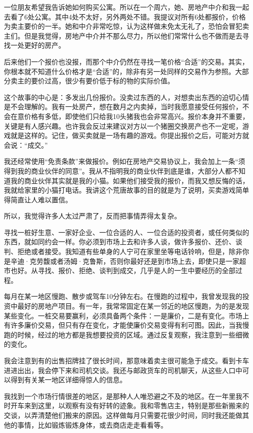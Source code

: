 一位朋友希望我告诉她如何购买公寓。所以在一个周六，她、房地产中介和我一起去看了6处公寓。其中4处不太好，另外两处不错。我提议对所有6处都报价，价格为卖主要价的一半。她和中介非常吃惊，认为这样做未免太无礼了，恐怕会冒犯卖主们。但是我觉得，房地产中介并不那么尽力，所以他们常常什么也不做而是去寻找一处更好的房产。

后来他们一个报价也没报，而那个中介仍然在寻找一笔价格“合适”的交易。其实，你根本就不知道什么价格才是“合适”的，除非有另一处同样的交易作为参照。大部分卖主的要价过高，很少有要价低于标的物的实际价值。

这个故事的中心是：多发出几份报价。没卖过东西的人，对想卖出东西的迫切心情是不会理解的。我有一处房产，想在数月之内卖掉，当时我愿意接受任何报价，不会在意价格有多低，即使他们只给我10头猪我也会非常高兴。报价本身并不重要，关键是有人感兴趣。也许我会反过来建议对方以一个猪圈交换房产也不一定呢，游戏就是这样的。记住，做买卖就是一场有趣的游戏。你提出报价之后，可能对方就会说：“成交。”

我还经常使用“免责条款”来做报价。例如在房地产交易协议上，我会加上一条“须得到我的商业伙伴的同意”。我从不指明我的商业伙伴到底是谁，大部分人都不知道我的商业伙伴其实就是我的小猫。如果他们接受我的报价，而我又想反悔的话，我就给家里的小猫打电话。我讲这个荒唐故事的目的就是为了说明，买卖游戏简单得简直让人难以置信。

所以，我觉得许多人太过严肃了，反而把事情弄得太复杂。

寻找一桩好生意、一家好企业、一位合适的人、一位合适的投资者，或任何类似的东西，就如同约会一样。你必须到市场上去和许多人谈，做许多报价、还价、谈判、拒绝或者接受。我知道有些单身的人宁可在家里坐等电话铃响，但是，除非你是辛迪·克劳馥或者汤姆·克鲁斯，否则你最好还是到市场上去，即使只是一家超市也好。从寻找、报价、拒绝、谈判到成交，几乎是人的一生中要经历的全部过程。

每月在某一地区慢跑、散步或驾车10分钟左右。在慢跑的过程中，我曾发现我的投资中最好的房地产项目。有一年，我常常固定在某一邻近的地区慢跑，为的是发现某些变化。一桩交易要赢利，必须具备两个条件：一是廉价，二是有变化。市场上有许多廉价交易，但只有存在变化，才能使廉价交易变得有利可图。因此，当我慢跑的时候，经过的地方都是我想要投资的区域。通过反复观察，我注意到一些细微的变化。

我会注意到有的出售招牌挂了很长时间，那意味着卖主很可能急于成交。看到卡车进进出出，我会停下来和司机交谈。我还与邮政货车的司机聊天，从这些人口中可以得到有关某一地区详细得惊人的信息。

我找到一个市场行情很差的地区，是那种人人唯恐避之不及的地区。在一年里我不时开车来到这里，以观察有没有好转的迹象。我和零售店主，特别是那些新搬来的交谈，以弄清楚他们搬来的原因。这样做每月只需要花很少时间，同时我还能做其他的事情，比如锻炼锻炼身体，或去商店走走看看等。

